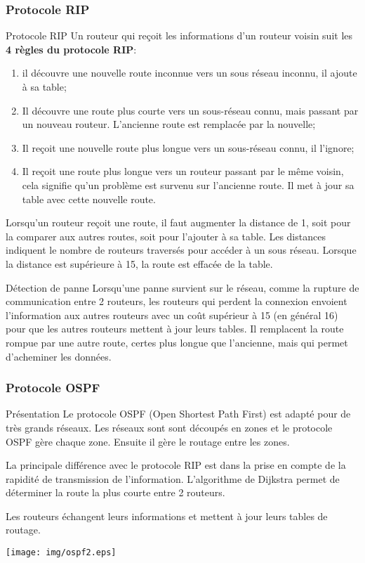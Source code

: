 \documentclass[8pt]{beamer}
\begin{document}
\begin{frame}
\frametitle{Protocole RIP}

\begin{block}{Protocole RIP}
Un routeur qui reçoit les informations d'un routeur voisin suit les \textbf{4 règles du protocole RIP}:
\begin{enumerate}
\item il découvre une nouvelle route inconnue vers un sous réseau inconnu, il ajoute à sa table;
\item Il découvre une route plus courte vers un sous-réseau connu, mais passant par un nouveau routeur. L'ancienne route est remplacée par la nouvelle;
\item Il reçoit une nouvelle route plus longue vers un sous-réseau connu, il l'ignore;
\item Il reçoit une route plus longue vers un routeur passant par le même voisin, cela signifie qu'un problème est survenu sur l'ancienne route. Il met à jour sa table avec cette nouvelle route.
\end{enumerate}
Lorsqu'un routeur reçoit une route, il faut augmenter la distance de 1, soit pour la comparer aux autres routes, soit pour l'ajouter à sa table. Les distances indiquent le nombre de routeurs traversés pour accéder à un sous réseau. Lorsque la distance est supérieure à 15, la route est effacée de la table.
\end{block}

\begin{block}{Détection de panne}
Lorsqu'une panne survient sur le réseau, comme la rupture de communication entre 2 routeurs, les routeurs qui perdent la connexion envoient l'information aux autres routeurs avec un coût supérieur à 15 (en général 16) pour que les autres routeurs mettent à jour leurs tables. Il remplacent la route rompue par une autre route, certes plus longue que l'ancienne, mais qui permet d'acheminer les données.
\end{block}
\end{frame}

\begin{frame}
\frametitle{Protocole OSPF}

\begin{block}{Présentation}
Le protocole OSPF (Open Shortest Path First) est adapté pour de très grands réseaux. Les réseaux sont sont découpés en zones et le protocole OSPF gère chaque zone. Ensuite il gère le routage entre les zones. \medskip

La principale différence avec le protocole RIP est dans la prise en compte de la rapidité de transmission de l'information. L'algorithme de Dijkstra permet de déterminer la route la plus courte entre 2 routeurs. \medskip

Les routeurs échangent leurs informations et mettent à jour leurs tables de routage.

\begin{center}
\texttt{[image: img/ospf2.eps]}
\end{center}
\end{block}
\end{frame}
\end{document}
